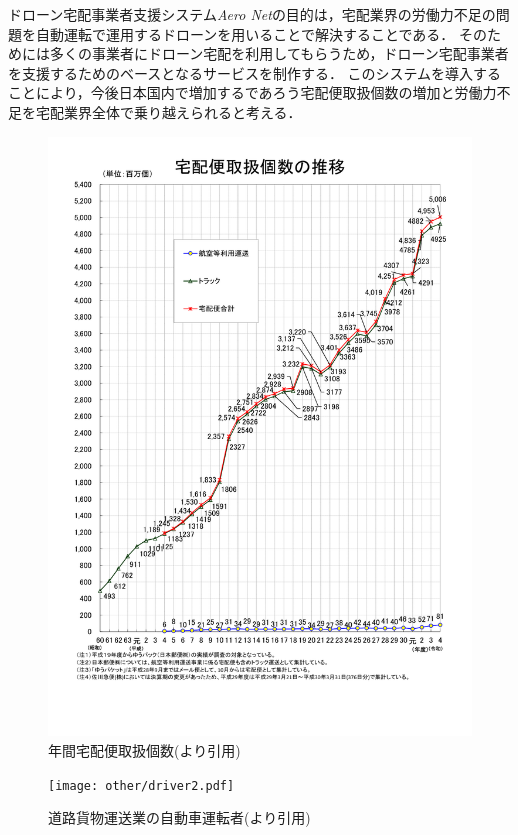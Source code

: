 \documentclass[a4paper, titlepage]{jsarticle}
\newcommand{\system}{\textsl{Aero Net}}
\begin{document}
ドローン宅配事業者支援システム\system の目的は，宅配業界の労働力不足の問題を自動運転で運用するドローンを用いることで解決することである．
そのためには多くの事業者にドローン宅配を利用してもらうため，ドローン宅配事業者を支援するためのベースとなるサービスを制作する．
このシステムを導入することにより，今後日本国内で増加するであろう宅配便取扱個数の増加と労働力不足を宅配業界全体で乗り越えられると考える．
\begin{figure}[H]
  \centering
  \includegraphics[height=\textheight]{other/number.pdf}
  \caption{年間宅配便取扱個数(\cite{home_delivery_2022}より引用)}
  \label{fig:number}
\end{figure}
\begin{figure}[H]
  \centering
  \texttt{[image: other/driver2.pdf]}
  \caption{道路貨物運送業の自動車運転者(\cite{Human_Resource}より引用)}
  \label{fig:driver}
\end{figure}
\end{document}
